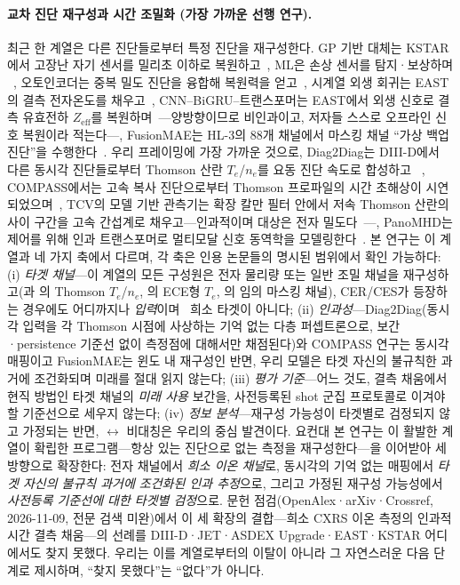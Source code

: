 \documentclass[10pt,a4paper]{article}
\begin{document}
\paragraph{교차 진단 재구성과 시간 조밀화 (가장 가까운 선행 연구).}
최근 한 계열은 다른 진단들로부터 특정 진단을 재구성한다. GP 기반 대체는
KSTAR에서 고장난 자기 센서를 밀리초 이하로
복원하고~\citep{Joung2018ImputationFaulty}, ML은 손상 센서를 탐지·보상하며
~\citep{Mohapatra2019RealtimeSensor}, 오토인코더는 중복 밀도 진단을 융합해
복원력을 얻고~\citep{Kaldas2026DevelopingAutoencoder}, 시계열 외생 회귀는
EAST의 결측 전자온도를 채우고~\citep{Wang2025TimeSeries}, CNN--BiGRU--트랜스포머는
EAST에서 외생 신호로 결측 유효전하 $Z_{\mathrm{eff}}$를
복원하며~\citep{Jia2026TimeSeries}---양방향이므로 비인과이고, 저자들 스스로 오프라인
신호 복원이라 적는다---, FusionMAE는 HL-3의
88개 채널에서 마스킹 채널 ``가상 백업 진단''을
수행한다~\citep{Yang2026FusionmaeSelfsupervised}. 우리 프레이밍에 가장 가까운
것으로, Diag2Diag는 DIII-D에서 다른 동시각 진단들로부터 Thomson 산란
$T_e$/$n_e$를 요동 진단 속도로 합성하고
~\citep{Jalalvand2025MultimodalSuperresolution}, COMPASS에서는 고속 복사
진단으로부터 Thomson 프로파일의 시간 초해상이
시연되었으며~\citep{Imrek2026TemporalSuperresolution}, TCV의 모델 기반 관측기는
확장 칼만 필터 안에서 저속 Thomson 산란의 사이 구간을 고속 간섭계로
채우고---인과적이며 대상은 전자 밀도다~\citep{Pastore2023ModelBased}---, PanoMHD는 제어를 위해
인과 트랜스포머로 멀티모달 신호 동역학을
모델링한다~\citep{Noh2026PanomhdMultimodal}. 본 연구는 이 계열과 네 가지
축에서 다르며, 각 축은 인용 논문들의 명시된 범위에서 확인 가능하다:
(i) \emph{타겟 채널}---이 계열의 모든 구성원은 전자 물리량 또는 일반 조밀
채널을 재구성하고(\citealp{Jalalvand2025MultimodalSuperresolution}과
\citealp{Imrek2026TemporalSuperresolution}의 Thomson $T_e$/$n_e$,
\citealp{Wang2025TimeSeries}의 ECE형 $T_e$,
\citealp{Yang2026FusionmaeSelfsupervised}의 임의 마스킹 채널), CER/CES가
등장하는 경우에도 어디까지나
\emph{입력}이며~\citep{Jalalvand2025MultimodalSuperresolution} 희소 타겟이
아니다; (ii) \emph{인과성}---Diag2Diag(동시각 입력을 각 Thomson 시점에 사상하는 기억
없는 다층 퍼셉트론으로, 보간·persistence 기준선 없이 측정점에 대해서만 채점된다)와
COMPASS 연구는 동시각 매핑이고 FusionMAE는 윈도 내 재구성인 반면, 우리 모델은 타겟 자신의 불규칙한
과거에 조건화되며 미래를 절대 읽지 않는다; (iii) \emph{평가 기준}---어느
것도, 결측 채움에서 현직 방법인 타겟 채널의 \emph{미래 사용} 보간을,
사전등록된 shot 군집 프로토콜로 이겨야 할 기준선으로 세우지 않는다;
(iv) \emph{정보 분석}---재구성 가능성이 타겟별로 검정되지 않고 가정되는 반면,
\Ti$\leftrightarrow$\Vrot{} 비대칭은 우리의 중심 발견이다. 요컨대 본 연구는 이
활발한 계열이 확립한 프로그램---항상 있는 진단으로 없는 측정을
재구성한다---을 이어받아 세 방향으로 확장한다: 전자 채널에서 \emph{희소 이온
채널}로, 동시각의 기억 없는 매핑에서 \emph{타겟 자신의 불규칙 과거에 조건화된
인과 추정}으로, 그리고 가정된 재구성 가능성에서 \emph{사전등록 기준선에 대한
타겟별 검정}으로. 문헌 점검(OpenAlex·arXiv·Crossref, 2026-11-09, 전문 검색 미완)에서 이 세 확장의
결합---희소 CXRS 이온 측정의 인과적 시간 결측 채움---의 선례를 DIII-D·JET·ASDEX
Upgrade·EAST·KSTAR 어디에서도 찾지 못했다. 우리는 이를 계열로부터의 이탈이 아니라 그
자연스러운 다음 단계로 제시하며, ``찾지 못했다''는 ``없다''가 아니다.
\end{document}
